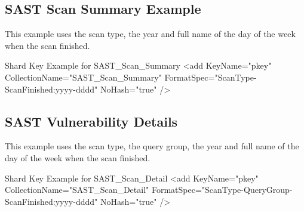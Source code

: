 \subsection{SAST Scan Summary Example}

This example uses the scan type, the year and full name of the day of the week when the scan finished.

\begin{code}{Shard Key Example for SAST\_Scan\_Summary}{}{}
<add KeyName="pkey" CollectionName="SAST_Scan_Summary"
    FormatSpec="{ScanType}-{ScanFinished:yyyy-dddd}" NoHash="true" />
\end{code}

\subsection{SAST Vulnerability Details}

This example uses the scan type, the query group, the year and full name of the day of the week when the scan finished.

\begin{code}{Shard Key Example for SAST\_Scan\_Detail}{}{}
<add KeyName="pkey" CollectionName="SAST_Scan_Detail"
    FormatSpec="{ScanType}-{QueryGroup}-{ScanFinished:yyyy-dddd}" NoHash="true" />
\end{code}

